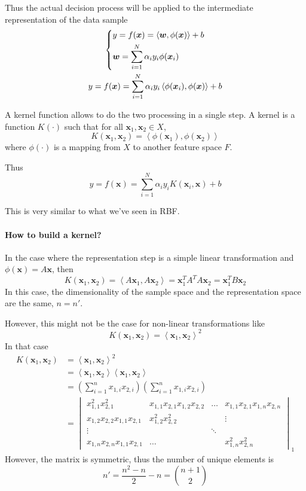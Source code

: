 \documentclass[oneside,onecolumn]{report}
\newcommand{\inp}[2]{\left\langle #1, #2 \right\rangle}
\begin{document}
Thus the actual decision process will be applied to the intermediate representation of the data sample
\begin{gather*}
\begin{dcases}
    y = f(\bm x) = \inp{\bm w}{\phi(\bm x)} + b \\
    \bm w = \sum_{i = 1}^N \alpha_i y_i \phi(\bm x_i)
\end{dcases}
\\
y = f(\bm x) = \sum_{i = 1}^N \alpha_i y_i \inp{\phi(\bm x_i)}{\phi(\bm x)} + b
\end{gather*}

A kernel function allows to do the two processing in a single step.
A kernel is a function $K(\cdot)$ such that for all $\bm x_1, \bm x_2 \in X$,
$$ K(\bm x_1, \bm x_2) = \inp{\phi(\bm x_1)}{\phi(\bm x_2)} $$
where $\phi(\cdot)$ is a mapping from $X$ to another feature space $F$.

Thus
$$ y = f(\bm x) = \sum_{i = 1}^N \alpha_i y_i K(\bm x_i, \bm x) + b $$

This is very similar to what we've seen in RBF.

\paragraph{How to build a kernel?}
In the case where the representation step is a simple linear transformation and $\phi(\bm x) = A \bm x$, then
$$ K(\bm x_1, \bm x_2) = \inp{A \bm x_1}{A \bm x_2} = \bm x_1^T A^T A \bm x_2 = \bm x_1^T B \bm x_2 $$
In this case, the dimensionality of the sample space and the representation space are the same, $n = n'$.

However, this might not be the case for non-linear transformations like
$$ K(\bm x_1, \bm x_2) = \inp{\bm x_1}{\bm x_2}^2 $$
In that case
\begin{align*}
    K(\bm x_1, \bm x_2)
    &= \inp{\bm x_1}{\bm x_2}^2 \\
    &= \inp{\bm x_1}{\bm x_2} \inp{\bm x_1}{\bm x_2} \\
    &= \left( \sum_{i = 1}^n x_{1, i} x_{2, i} \right) \left( \sum_{i = 1}^n x_{1, i} x_{2, i} \right) \\
    &= \begin{vmatrix}
        x_{1, 1}^2 x_{2, 1}^2 & x_{1, 1} x_{2, 1} x_{1, 2} x_{2, 2} & \dots & x_{1, 1} x_{2, 1} x_{1, n} x_{2, n} \\
        x_{1, 2} x_{2, 2} x_{1, 1} x_{2, 1} & x_{1, 2}^2 x_{2, 2}^2 &  & \vdots \\
        \vdots &  & \ddots & \\
        x_{1, n} x_{2, n} x_{1, 1} x_{2, 1} & \dots & & x_{1, n}^2 x_{2, n}^2
    \end{vmatrix}_1
\end{align*}
However, the matrix is symmetric, thus the number of unique elements is
$$ n' = \frac{n^2 - n}{2} - n = \binom{n + 1}{2} $$
\end{document}

